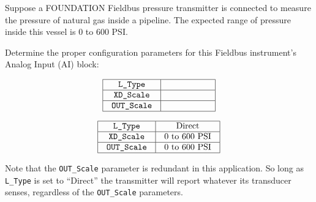 

Suppose a FOUNDATION Fieldbus pressure transmitter is connected to measure the pressure of natural gas inside a pipeline.  The expected range of pressure inside this vessel is 0 to 600 PSI.

\vskip 10pt

Determine the proper configuration parameters for this Fieldbus instrument's Analog Input (AI) block:


$$\vbox{\offinterlineskip
\halign{\strut
\vrule \quad\hfil # \ \hfil & 
\vrule \quad\hfil # \ \hfil \vrule \cr
\noalign{\hrule}
%
{\tt L\_Type} & \hskip 50pt \cr
%
\noalign{\hrule}
%
{\tt XD\_Scale} & \hskip 50pt \cr
%
\noalign{\hrule}
%
{\tt OUT\_Scale} & \hskip 50pt \cr
%
\noalign{\hrule}
} %
}$$ %








$$\vbox{\offinterlineskip
\halign{\strut
\vrule \quad\hfil # \ \hfil & 
\vrule \quad\hfil # \ \hfil \vrule \cr
\noalign{\hrule}
%
{\tt L\_Type} & Direct \cr
%
\noalign{\hrule}
%
{\tt XD\_Scale} & 0 to 600 PSI \cr
%
\noalign{\hrule}
%
{\tt OUT\_Scale} & 0 to 600 PSI \cr
%
\noalign{\hrule}
} %
}$$ %

\vskip 10pt

Note that the {\tt OUT\_Scale} parameter is redundant in this application.  So long as {\tt L\_Type} is set to ``Direct'' the transmitter will report whatever its transducer senses, regardless of the {\tt OUT\_Scale} parameters.












